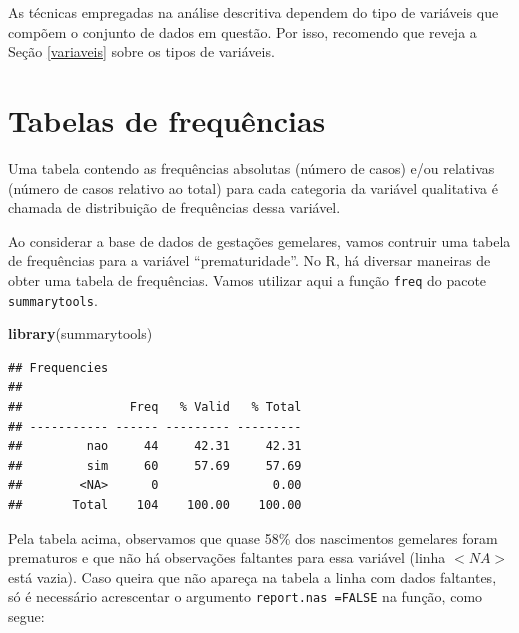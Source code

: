\documentclass[
]{book}
\newenvironment{Shaded}{\begin{snugshade}}{\end{snugshade}}
\newcommand{\DataTypeTok}[1]{\textcolor[rgb]{0.13,0.29,0.53}{#1}}
\newcommand{\KeywordTok}[1]{\textcolor[rgb]{0.13,0.29,0.53}{\textbf{#1}}}
\newcommand{\NormalTok}[1]{#1}
\newcommand{\OperatorTok}[1]{\textcolor[rgb]{0.81,0.36,0.00}{\textbf{#1}}}
\newcommand{\OtherTok}[1]{\textcolor[rgb]{0.56,0.35,0.01}{#1}}
\begin{document}
As técnicas empregadas na análise descritiva dependem do tipo de variáveis que compõem o conjunto de dados em questão. Por isso, recomendo que reveja a Seção \ref{variaveis} sobre os tipos de variáveis.

\hypertarget{tabelas-de-frequuxeancias}{%
\section{Tabelas de frequências}\label{tabelas-de-frequuxeancias}}

Uma tabela contendo as frequências absolutas (número de casos) e/ou relativas (número de casos relativo ao total) para cada categoria da variável qualitativa é chamada de distribuição de frequências dessa variável.

Ao considerar a base de dados de gestações gemelares, vamos contruir uma tabela de frequências para a variável ``prematuridade''. No R, há diversar maneiras de obter uma tabela de frequências. Vamos utilizar aqui a função \texttt{freq} do pacote \texttt{summarytools}.

\begin{Shaded}
\begin{Highlighting}[]
\KeywordTok{library}\NormalTok{(summarytools)}
\end{Highlighting}
\end{Shaded}

\begin{Shaded}
\end{Shaded}

\begin{verbatim}
## Frequencies  
## 
##               Freq   % Valid   % Total
## ----------- ------ --------- ---------
##         nao     44     42.31     42.31
##         sim     60     57.69     57.69
##        <NA>      0                0.00
##       Total    104    100.00    100.00
\end{verbatim}

Pela tabela acima, observamos que quase 58\% dos nascimentos gemelares foram prematuros e que não há observações faltantes para essa variável (linha \(<NA>\) está vazia). Caso queira que não apareça na tabela a linha com dados faltantes, só é necessário acrescentar o argumento \texttt{report.nas\ =FALSE} na função, como segue:
\end{document}

